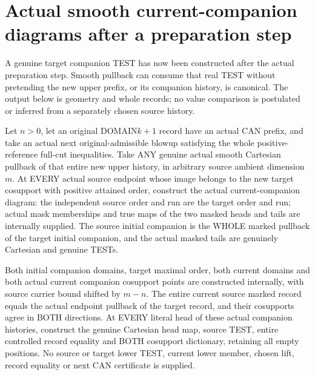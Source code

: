 \section{Actual smooth current-companion diagrams after a preparation step}

A genuine target companion TEST has now been constructed after the actual
preparation step. Smooth pullback can consume that real TEST without
pretending the new upper prefix, or its companion history, is canonical.
The output below is geometry and whole records; no value comparison is
postulated or inferred from a separately chosen source history.

\begin{theorem}
\label{hir:original-prepared-current-companion-smooth-diagram}
\leanok
Let $n>0$, let an original DOMAIN$k+1$ record have an actual CAN prefix,
and take an actual next original-admissible blowup satisfying the whole
positive-reference full-cut inequalities. Take ANY genuine actual smooth
Cartesian pullback of that entire new upper history, in arbitrary source
ambient dimension $m$. At EVERY actual source endpoint whose image belongs
to the new target cosupport with positive attained order, construct the
actual current-companion diagram: the independent source order and run
are the target order and run; actual mask memberships and true maps of the
two masked heads and tails are internally supplied. The source initial
companion is the WHOLE marked pullback of the target initial companion,
and the actual masked tails are genuinely Cartesian and genuine TESTs.

Both initial companion domains, target maximal order, both current domains
and both actual current companion cosupport points are constructed
internally, with source carrier bound shifted by $m-n$. The entire current
source marked record equals the actual endpoint pullback of the target
record, and their cosupports agree in BOTH directions. At EVERY literal
head of these actual companion histories, construct the genuine Cartesian
head map, source TEST, entire controlled record equality and BOTH
cosupport dictionary, retaining all empty positions. No source or target
lower TEST, current lower member, chosen lift, record equality or next CAN
certificate is supplied.
\end{theorem}
